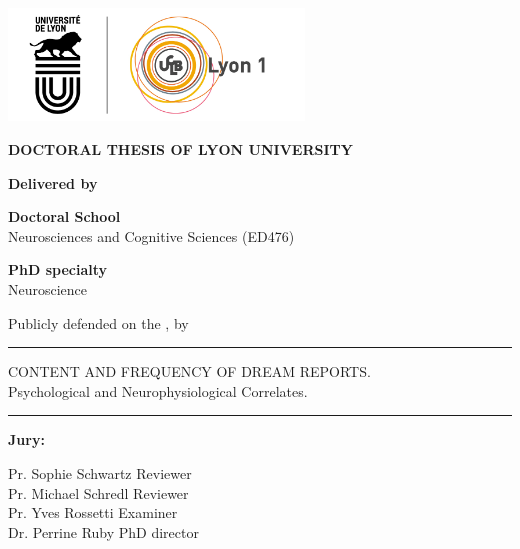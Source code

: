 \begin{titlepage}

  \setlength{\parindent}{0pt}
  \thispagestyle{empty}

  \begin{center}
  \includegraphics[height=3cm]{content/logo}
  \end{center}

  \bigskip

  \begin{center}
  \fontsize{14pt}{16pt}\selectfont
  \textbf{\uppercase{DOCTORAL THESIS OF LYON UNIVERSITY}} \\

  \bigskip

  \fontsize{12pt}{14pt}\selectfont
  \textbf{Delivered by}\\ \medskip
  \thesisUniversity

  \textbf{Doctoral School}\\ \medskip
  Neurosciences and Cognitive Sciences (ED476)

  \textbf{PhD specialty}\\ \medskip
  Neuroscience

  Publicly defended on the \thesisDate, by \\ \medskip
  \fontsize{14pt}{16pt}\selectfont
  \textbf{\thesisName}

  \rule{\textwidth}{0.5pt}

  \fontsize{16pt}{20pt}\selectfont
  CONTENT AND FREQUENCY OF DREAM REPORTS.\\ \medskip
  Psychological and Neurophysiological Correlates.
  \rule{\textwidth}{0.5pt}

  \end{center}

  \fontsize{12pt}{14pt}\selectfont
  \textbf{Jury:}

  Pr. Sophie Schwartz  	\hfill Reviewer\\
  Pr. Michael Schredl 	\hfill Reviewer\\
  Pr. Yves Rossetti 	\hfill Examiner\\
  Dr. Perrine Ruby 		\hfill PhD director\\

  \vfill

\end{titlepage}

\cleardoublepage

